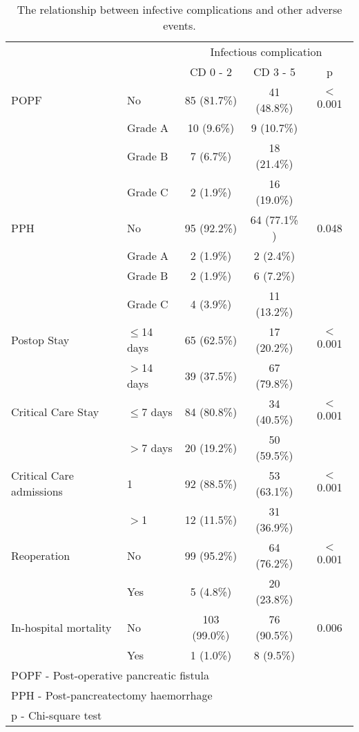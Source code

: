 \begin{table}[p]
	\centering
	\caption{The relationship between infective complications and other adverse events.}
	\label{table:crp_comp_infect_vs_other_complications}
	\renewcommand{\arraystretch}{1.2} %
	\setlength{\tabcolsep}{9pt} %
	\begin{tabular}{|l l | c c c|}
		\hline
		                         &               & \multicolumn{3}{c|}{Infectious complication} \\
		                         &               & CD 0 - 2     & CD 3 - 5     & p              \\ \hline
		POPF                     & No            & 85 (81.7\%)  & 41 (48.8\%)  & $<$0.001       \\
		                         & Grade A       & 10 (9.6\%)   & 9 (10.7\%)   &  \\
		                         & Grade B       & 7 (6.7\%)    & 18 (21.4\%)  &  \\
		                         & Grade C       & 2 (1.9\%)    & 16 (19.0\%)  &  \\
		PPH                      & No            & 95 (92.2\%)  & 64 (77.1\% ) & 0.048          \\
		                         & Grade A       & 2 (1.9\%)    & 2 (2.4\%)    &  \\
		                         & Grade B       & 2 (1.9\%)    & 6 (7.2\%)    &  \\
		                         & Grade C       & 4  (3.9\%)   & 11 (13.2\%)  &  \\
		Postop Stay              & $\leq$14 days & 65 (62.5\%)  & 17 (20.2\%)  & $<$0.001       \\
		                         & $>$14 days    & 39 (37.5\%)  & 67 (79.8\%)  &  \\
		Critical Care Stay       & $\leq$7 days  & 84 (80.8\%)  & 34 (40.5\%)  & $<$0.001       \\
		                         & $>$7 days     & 20 (19.2\%)  & 50 (59.5\%)  &  \\
		Critical Care admissions & 1             & 92 (88.5\%)  & 53 (63.1\%)  & $<$0.001       \\
		                         & $>$1          & 12 (11.5\%)  & 31 (36.9\%)  &  \\
		Reoperation              & No            & 99 (95.2\%)  & 64 (76.2\%)  & $<$0.001       \\
		                         & Yes           & 5 (4.8\%)    & 20 (23.8\%)  &  \\
		In-hospital mortality    & No            & 103 (99.0\%) & 76 (90.5\%)  & 0.006          \\
		                         & Yes           & 1 (1.0\%)    & 8 (9.5\%)    &  \\ \hline
		\multicolumn{5}{l}{POPF - Post-operative pancreatic fistula}                            \\
		\multicolumn{5}{l}{PPH - Post-pancreatectomy haemorrhage}                               \\
		\multicolumn{5}{l}{p - Chi-square test}
	\end{tabular}
\end{table}

